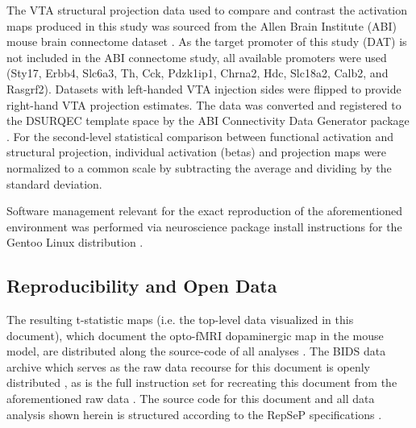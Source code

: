 The VTA structural projection data used to compare and contrast the activation maps produced in this study was sourced from the Allen Brain Institute (ABI) mouse brain connectome dataset \cite{abic}.
As the target promoter of this study (DAT) is not included in the ABI connectome study, all available promoters were used (Sty17, Erbb4, Slc6a3, Th, Cck, Pdzk1ip1, Chrna2, Hdc, Slc18a2, Calb2, and Rasgrf2).
Datasets with left-handed VTA injection sides were flipped to provide right-hand VTA projection estimates.
The data was converted and registered to the DSURQEC template space by the ABI Connectivity Data Generator package \cite{abic_g}.
For the second-level statistical comparison between functional activation and structural projection, individual activation (betas) and projection maps were normalized to a common scale by subtracting the average and dividing by the standard deviation.

Software management relevant for the exact reproduction of the aforementioned environment was performed via neuroscience package install instructions for the Gentoo Linux distribution \cite{ng}.

\subsection{Reproducibility and Open Data}

The resulting t-statistic maps (i.e. the top-level data visualized in this document), which document the opto-fMRI dopaminergic map in the mouse model, are distributed along the source-code of all analyses \cite{me}.
The BIDS \cite{bids} data archive which serves as the raw data recourse for this document is openly distributed \cite{opfvta_bidsdata}, as is the full instruction set for recreating this document from the aforementioned raw data \cite{me}.
The source code for this document and all data analysis shown herein is structured according to the RepSeP specifications \cite{repsep}.
